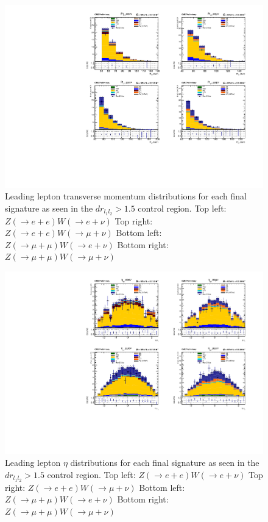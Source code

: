 \begin{figure}[tph]
  \centering
  \includegraphics[width=\textwidth]{fig/Run2/KFactorIncluded_HPtl1_CR1_A_Run2_HPtRun2_M600.pdf}
  \caption{Leading lepton transverse momentum distributions for each final
    signature as seen in the $dr_{l_{1}l_{2}} > 1.5$ control region.
    Top left: $Z(\rightarrow e+e)W(\rightarrow e+\nu)$
    Top right: $Z(\rightarrow e+e)W(\rightarrow \mu+\nu)$
    Bottom left: $Z(\rightarrow \mu+\mu)W(\rightarrow e+\nu)$
    Bottom right: $Z(\rightarrow \mu+\mu)W(\rightarrow \mu+\nu)$}
  \label{fig:CR1_Run2_HPtl1}
\end{figure}

\begin{figure}[tph]
  \centering
  \includegraphics[width=\textwidth]{fig/Run2/KFactorIncluded_HEtal1_CR1_A_Run2_HERun2_M600.pdf}
  \caption{Leading lepton $\eta$ distributions for each final
    signature as seen in the $dr_{l_{1}l_{2}} > 1.5$ control region.
    Top left: $Z(\rightarrow e+e)W(\rightarrow e+\nu)$
    Top right: $Z(\rightarrow e+e)W(\rightarrow \mu+\nu)$
    Bottom left: $Z(\rightarrow \mu+\mu)W(\rightarrow e+\nu)$
    Bottom right: $Z(\rightarrow \mu+\mu)W(\rightarrow \mu+\nu)$}
  \label{fig:CR1_Run2_HEtal1}
\end{figure}

